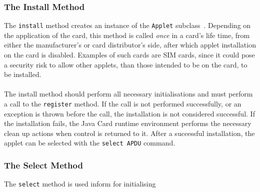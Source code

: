 \subsubsection{The Install Method}\label{subsec:jcinstall}
The \texttt{install} method creates an instance of the \texttt{Applet} subclass~\cite[p. 65]{java_card_spec}. Depending on the application of the card, this method is called \textit{once} in a card's life time, from either the manufacturer's or card distributor's side, after which applet installation on the card is disabled. Examples of such cards are SIM cards, since it could pose a security risk to allow other applets, than those intended to be on the card, to be installed.\\\\
The install method should perform all necessary initialisations and must perform a call to the \texttt{register} method. If the call is not performed successfully, or an exception is thrown before the call, the installation is not considered successful. If the installation fails, the Java Card runtime environment performs the necessary clean up actions when control is returned to it. After a successful installation, the applet can be selected with the \texttt{select APDU} command.


\subsubsection{The Select Method}\label{subsec:jcinstall}
The \texttt{select} method is used inform for initialising  